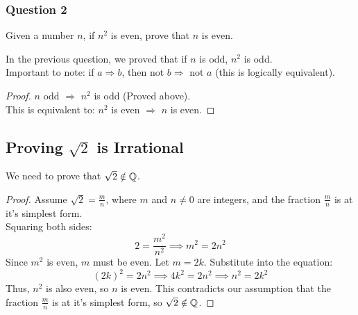 \subsubsection{Question 2}
Given a number $n$, if $n^2$ is even, prove that $n$ is even.

\noindent In the previous question, we proved that if $n$ is odd, $n^2$ is odd.\\

\noindent Important to note: if $a \Longrightarrow b$, then not $b \Longrightarrow$ not $a$ (this is logically equivalent).\\
\begin{proof}
$n$ odd $\Longrightarrow$ $n^2$ is odd (Proved above).\\
This is equivalent to: $n^2$ is even $\Longrightarrow$ $n$ is even.
\end{proof}



\subsection{Proving $\sqrt{2}$ is Irrational}
We need to prove that \( \sqrt{2} \notin \mathbb{Q} \).

\begin{proof}
Assume \( \sqrt{2} = \frac{m}{n} \), where \( m \) and \( n\neq 0 \) are integers, and the fraction $\frac{m}{n}$ is at it's simplest form.\\  
Squaring both sides:
\[
2 = \frac{m^2}{n^2} \implies m^2 = 2n^2
\]
Since $m^2$ is even, $m$ must be even. Let $m = 2k$.  
Substitute into the equation:
\[
(2k)^2 = 2n^2 \implies 4k^2 = 2n^2 \implies n^2 = 2k^2
\]
Thus, $n^2$ is also even, so $n$ is even.  
This contradicts our assumption that the fraction $\frac{m}{n}$ is at it's simplest form, so $\sqrt{2} \notin \mathbb{Q}$.
\end{proof}


